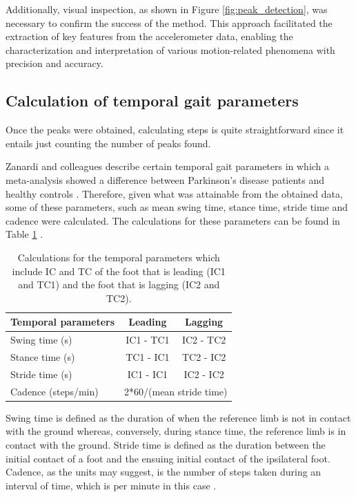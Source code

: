 Additionally, visual inspection, as shown in Figure \ref{fig:peak_detection}, was necessary to confirm the success of the method. This approach facilitated the extraction of key features from the accelerometer data, enabling the characterization and interpretation of various motion-related phenomena with precision and accuracy. 

\subsection{Calculation of temporal gait parameters}
Once the peaks were obtained, calculating steps is quite straightforward since it entails just counting the number of peaks found.

Zanardi and colleagues describe certain temporal gait parameters in which a meta-analysis showed a difference between Parkinson's disease patients and healthy controls \cite{zanardi_gait_2021}. Therefore, given what was attainable from the obtained data, some of these parameters, such as mean swing time, stance time, stride time and cadence were calculated. The calculations for these parameters can be found in Table \ref{tab:calculaitons} \cite{grucci_gait_2019}.

 \begin{table}[H] %
 	\caption{Calculations for the temporal parameters which include IC and TC of the foot that is leading (IC1 and TC1) and the foot that is lagging (IC2 and TC2).}
 	\centering %
 	\begin{tabularx}{\linewidth}{X|c|c|} %
 		\toprule
 		Temporal parameters & Leading & Lagging \\
 		\midrule
 		Swing time (s) & IC1 - TC1 & IC2 - TC2\\
 		Stance time (s)  & TC1 - IC1 & TC2 - IC2\\
 		Stride time (s)  & IC1 - IC1 & IC2 - IC2\\
 		Cadence (steps/min) & \multicolumn{2}{c|}{2*60/(mean stride time)}\\
 		\bottomrule
 	\end{tabularx}
 	\label{tab:calculaitons}
 \end{table} 

Swing time is defined as the duration of when the reference limb is not in contact with the ground whereas, conversely, during stance time, the reference limb is in contact with the ground. Stride time is defined as the duration between the initial contact of a foot and the ensuing initial contact of the ipsilateral foot. Cadence, as the units may suggest, is the number of steps taken during an interval of time, which is per minute in this case \cite{webster_principles_2019}.


